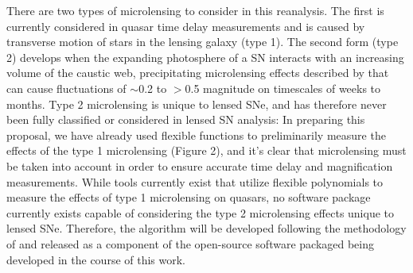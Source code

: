 There are two types of microlensing to consider in this reanalysis. The first is currently
considered in quasar time delay measurements and is caused by transverse motion 
of stars in the lensing galaxy (type 1). The second form (type 2) develops when the 
expanding photosphere of a SN interacts with an increasing volume of the caustic web, 
precipitating microlensing effects described by \cite{Dobler:2006} that can cause 
fluctuations of $\sim$0.2 to $>$0.5 magnitude on timescales of weeks to months. Type 2
microlensing is unique to lensed SNe, and has therefore never been fully classified or considered in lensed SN
analysis: In preparing this proposal, we have already used flexible functions to preliminarily measure the
effects of the type 1 microlensing (Figure 2), and it's clear that microlensing must be taken into account in order
to ensure accurate time delay and magnification measurements. While tools currently exist that utilize 
flexible polynomials to measure the effects of type 1 microlensing on quasars, no software package 
currently exists capable of considering the type 2 microlensing effects unique to lensed SNe. 
Therefore, the algorithm will be developed following the methodology of \cite{Dobler:2006} and released 
as a component of the open-source software packaged being developed in the course of this work. 

\pagebreak

